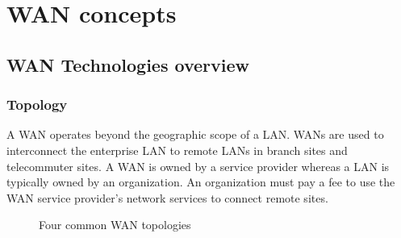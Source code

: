 \chapter{WAN concepts}

\section{WAN Technologies overview}

\subsection{Topology}

A WAN operates beyond the geographic scope of a LAN. WANs are used to interconnect the enterprise LAN to remote LANs in branch sites and telecommuter sites. A WAN is owned by a service provider whereas a LAN is typically owned by an organization. An organization must pay a fee to use the WAN service provider’s network services to connect remote sites.\\

\begin{figure}[hbtp]
\centering
{}
\caption{Four common WAN topologies}
\end{figure}

